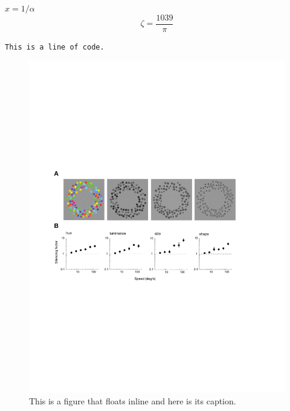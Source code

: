 $x = 1/\alpha$
\cite{Eigen1971, Knuth1968}
$$\zeta = \frac{1039}{\pi}$$




\texttt{This is a line of code.}


\begin{figure}
\includegraphics[width=\textwidth]{figures/fig1}
\caption[Short figure name.]{This is a figure that floats inline and here is its caption.
\label{fig:myInlineFigure}}
\end{figure}



